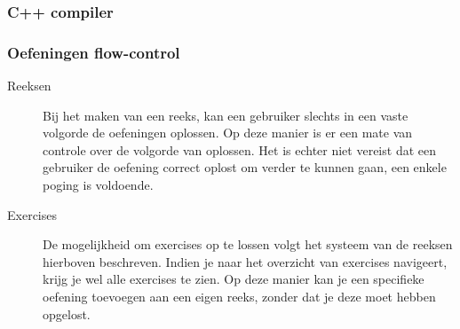 \subsubsection{C++ compiler}


\subsubsection{Oefeningen flow-control}
\begin{description}
\item[Reeksen] Bij het maken van een reeks, kan een gebruiker slechts in een vaste volgorde de oefeningen oplossen. Op deze manier is er
een mate van controle over de volgorde van oplossen. Het is echter niet vereist dat een gebruiker de oefening correct oplost
om verder te kunnen gaan, een enkele poging is voldoende.
\item[Exercises] De mogelijkheid om exercises op te lossen volgt het systeem van de reeksen hierboven beschreven. Indien je naar het
    overzicht van exercises navigeert, krijg je wel alle exercises te zien. Op deze manier kan je een specifieke oefening toevoegen 
    aan een eigen reeks, zonder dat je deze moet hebben opgelost.
\end{description}

